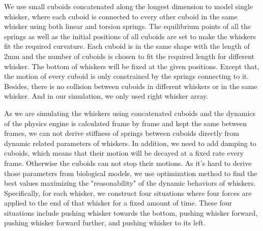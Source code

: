 We use small cuboids concatenated along the longest dimension to model single whisker, where each cuboid is connected to every other cuboid in the same whisker using both linear and torsion springs.
The equilibrium points of all the springs as well as the initial positions of all cuboids are set to make the whiskers fit the required curvature.
Each cuboid is in the same shape with the length of 2mm and the number of cuboids is chosen to fit the required length for different whisker.
The bottom of whiskers will be fixed at the given positions. Except that, the motion of every cuboid is only constrained by the springs connecting to it.
Besides, there is no collision between cuboids in different whiskers or in the same whisker.
And in our simulation, we only used right whisker array.

As we are simulating the whiskers using concatenated cuboids and the dynamics of the physics engine is calculated frame by frame and kept the same between frames, we can not derive stiffness of springs between cuboids directly from dynamic related parameters of whiskers.
In addition, we need to add damping to cuboids, which means that their motion will be decayed at a fixed rate every frame. Otherwise the cuboids can not stop their motions.
As it's hard to derive those parameters from biological models, we use optimization method to find the best values maximizing the "reasonability" of the dynamic behaviors of whiskers.
Specifically, for each whisker, we construct four situations where four forces are applied to the end of that whisker for a fixed amount of time.
These four situations include pushing whisker towards the bottom, pushing whisker forward, pushing whisker forward further, and pushing whisker to its left.

